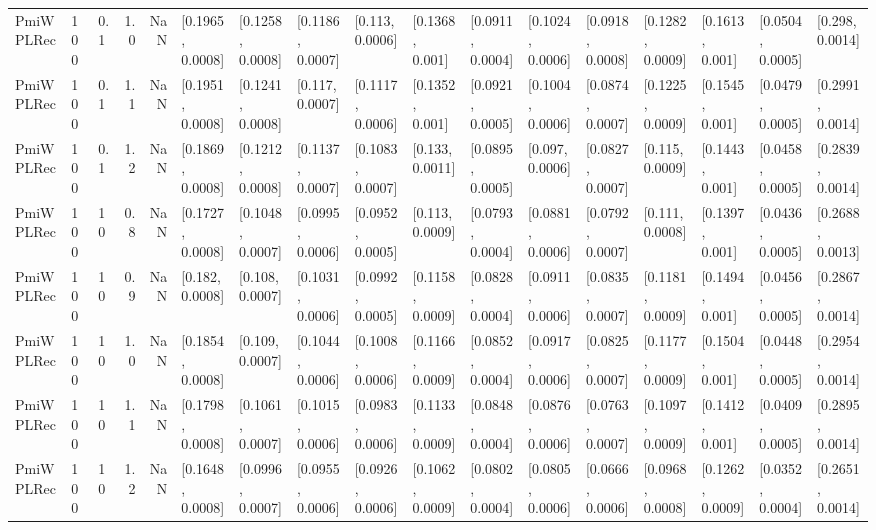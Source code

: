 \begin{tabular}{lllrrllllllllllll}
 PmiWPLRec &  100 &   0.1 &   1.0 &   NaN &  [0.1965, 0.0008] &  [0.1258, 0.0008] &  [0.1186, 0.0007] &   [0.113, 0.0006] &   [0.1368, 0.001] &  [0.0911, 0.0004] &  [0.1024, 0.0006] &  [0.0918, 0.0008] &  [0.1282, 0.0009] &   [0.1613, 0.001] &  [0.0504, 0.0005] &   [0.298, 0.0014] \\
 PmiWPLRec &  100 &   0.1 &   1.1 &   NaN &  [0.1951, 0.0008] &  [0.1241, 0.0008] &   [0.117, 0.0007] &  [0.1117, 0.0006] &   [0.1352, 0.001] &  [0.0921, 0.0005] &  [0.1004, 0.0006] &  [0.0874, 0.0007] &  [0.1225, 0.0009] &   [0.1545, 0.001] &  [0.0479, 0.0005] &  [0.2991, 0.0014] \\
 PmiWPLRec &  100 &   0.1 &   1.2 &   NaN &  [0.1869, 0.0008] &  [0.1212, 0.0008] &  [0.1137, 0.0007] &  [0.1083, 0.0007] &   [0.133, 0.0011] &  [0.0895, 0.0005] &   [0.097, 0.0006] &  [0.0827, 0.0007] &   [0.115, 0.0009] &   [0.1443, 0.001] &  [0.0458, 0.0005] &  [0.2839, 0.0014] \\
 PmiWPLRec &  100 &    10 &   0.8 &   NaN &  [0.1727, 0.0008] &  [0.1048, 0.0007] &  [0.0995, 0.0006] &  [0.0952, 0.0005] &   [0.113, 0.0009] &  [0.0793, 0.0004] &  [0.0881, 0.0006] &  [0.0792, 0.0007] &   [0.111, 0.0008] &   [0.1397, 0.001] &  [0.0436, 0.0005] &  [0.2688, 0.0013] \\
 PmiWPLRec &  100 &    10 &   0.9 &   NaN &   [0.182, 0.0008] &   [0.108, 0.0007] &  [0.1031, 0.0006] &  [0.0992, 0.0005] &  [0.1158, 0.0009] &  [0.0828, 0.0004] &  [0.0911, 0.0006] &  [0.0835, 0.0007] &  [0.1181, 0.0009] &   [0.1494, 0.001] &  [0.0456, 0.0005] &  [0.2867, 0.0014] \\
 PmiWPLRec &  100 &    10 &   1.0 &   NaN &  [0.1854, 0.0008] &   [0.109, 0.0007] &  [0.1044, 0.0006] &  [0.1008, 0.0006] &  [0.1166, 0.0009] &  [0.0852, 0.0004] &  [0.0917, 0.0006] &  [0.0825, 0.0007] &  [0.1177, 0.0009] &   [0.1504, 0.001] &  [0.0448, 0.0005] &  [0.2954, 0.0014] \\
 PmiWPLRec &  100 &    10 &   1.1 &   NaN &  [0.1798, 0.0008] &  [0.1061, 0.0007] &  [0.1015, 0.0006] &  [0.0983, 0.0006] &  [0.1133, 0.0009] &  [0.0848, 0.0004] &  [0.0876, 0.0006] &  [0.0763, 0.0007] &  [0.1097, 0.0009] &   [0.1412, 0.001] &  [0.0409, 0.0005] &  [0.2895, 0.0014] \\
 PmiWPLRec &  100 &    10 &   1.2 &   NaN &  [0.1648, 0.0008] &  [0.0996, 0.0007] &  [0.0955, 0.0006] &  [0.0926, 0.0006] &  [0.1062, 0.0009] &  [0.0802, 0.0004] &  [0.0805, 0.0006] &  [0.0666, 0.0006] &  [0.0968, 0.0008] &  [0.1262, 0.0009] &  [0.0352, 0.0004] &  [0.2651, 0.0014] \\

\end{tabular}

